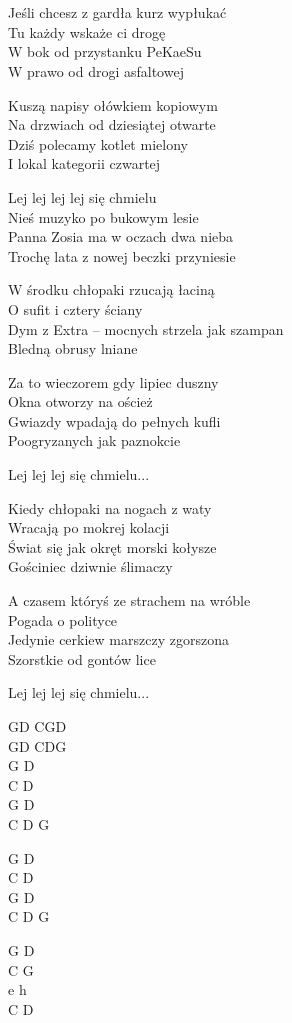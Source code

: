 \begin{text}
    ~\\
    ~\\
    Jeśli chcesz z gardła kurz wypłukać\\
    Tu każdy wskaże ci drogę\\
    W bok od przystanku PeKaeSu\\
    W prawo od drogi asfaltowej
    
    Kuszą napisy ołówkiem kopiowym\\
    Na drzwiach od dziesiątej otwarte\\
    Dziś polecamy kotlet mielony\\
    I lokal kategorii czwartej

    \vin Lej lej lej lej się chmielu\\
    \vin Nieś muzyko po bukowym lesie\\
    \vin Panna Zosia ma w oczach dwa nieba\\
    \vin Trochę lata z nowej beczki przyniesie

    W środku chłopaki rzucają łaciną\\
    O sufit i cztery ściany\\
    Dym z Extra – mocnych strzela jak szampan\\
    Bledną obrusy lniane
    
    Za to wieczorem gdy lipiec duszny\\
    Okna otworzy na oścież\\
    Gwiazdy wpadają do pełnych kufli\\
    Poogryzanych jak paznokcie
    
    \vin Lej lej lej się chmielu...
    
    Kiedy chłopaki na nogach z waty\\
    Wracają po mokrej kolacji\\
    Świat się jak okręt morski kołysze\\
    Gościniec dziwnie ślimaczy
    
    A czasem któryś ze strachem na wróble\\
    Pogada o polityce\\
    Jedynie cerkiew marszczy zgorszona\\
    Szorstkie od gontów lice
    
    \vin Lej lej lej się chmielu...
\end{text}
\begin{chord}
    GD CGD\\
    GD CDG\\
    G D\\
    C D\\
    G D\\
    C D G

    G D\\
    C D\\
    G D\\
    C D G

    G D\\
    C G\\
    e h\\
    C D
\end{chord}